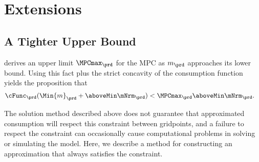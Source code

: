 \documentclass[titlepage, headings=optiontotocandhead]{econark}
\begin{document}

\section{Extensions}

\hypertarget{a-tighter-upper-bound}{}
\subsection{A Tighter Upper Bound}

  \cite{BufferStockTheory} derives an upper limit  $\MPCmax_{\prd}$ for the MPC as $m_{\prd}$
  approaches its lower bound.  Using this
  fact plus the strict concavity of the consumption function yields the
  proposition that
  \begin{equation}\begin{gathered}\begin{aligned}
        \cFunc_{\prd}(\Min{m}_{\prd}+\aboveMin \mNrm_{\prd}) & < \MPCmax_{\prd} \aboveMin \mNrm_{\prd}.
      \end{aligned}\end{gathered}\end{equation}

  The solution method described above does not guarantee that
  approximated consumption will respect this constraint between gridpoints, and a failure to
  respect the constraint can occasionally cause computational problems in solving
  or simulating the model.  Here, we
  describe a method for constructing an approximation that always
  satisfies the constraint.
\end{document}
